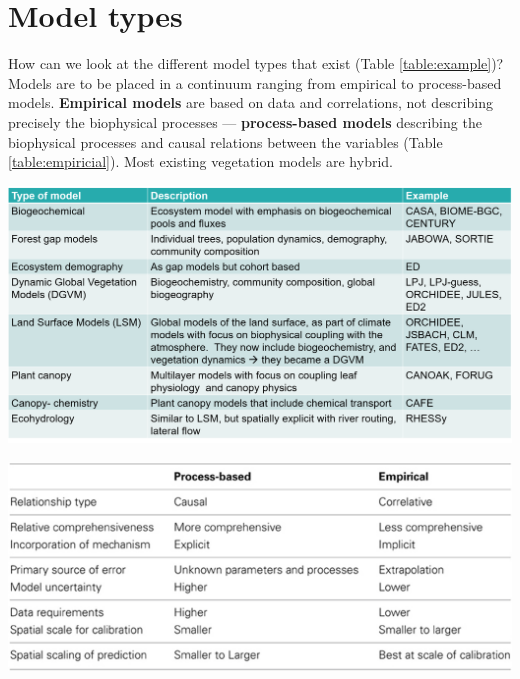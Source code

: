 \documentclass[12pt,oneside]{book}
\begin{document}
\section{Model types}\label{model-types}

How can we look at the different model types that exist (Table
\ref{table:example})? Models are to be placed in a continuum ranging
from empirical to process-based models. \textbf{Empirical models} are
based on data and correlations, not describing precisely the biophysical
processes --- \textbf{process-based models} describing the biophysical
processes and causal relations between the variables (Table
\ref{table:empiricial}). Most existing vegetation models are hybrid.

\begin{center}
\label{table:example}

\begin{center}\includegraphics[width=0.8\linewidth]{figures/chap1/table_model_types} \end{center}
\end{center}

\begin{center}
\label{table:empiricial}

\begin{center}\includegraphics[width=0.8\linewidth]{figures/chap1/tables_PB_empirical} \end{center}
\end{center}
\end{document}
